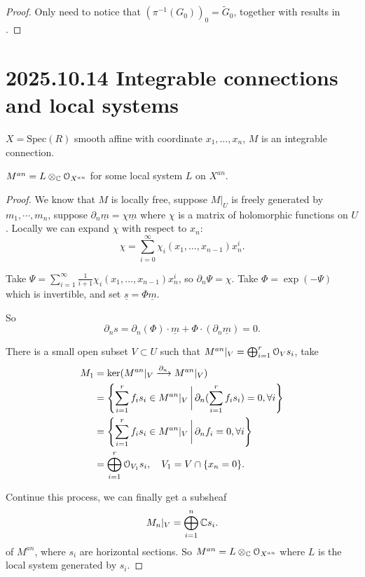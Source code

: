 \documentclass[12pt]{amsart}
\numberwithin{equation}{section}
\renewcommand{\tilde}{\widetilde}
\newcommand{\bigset}[2]{\Biggl\{#1\,\bigg\lvert\,#2\Biggr\}}
\begin{document}
\begin{proof}
  Only need to notice that $(\pi^{-1}(G_0))_0 = \tilde{G}_0$, together with results in \cite{Sch87}.
\end{proof}

 







\section{2025.10.14 Integrable connections and local systems}

$X = \mathrm{Spec}(R)$ smooth affine with coordinate $x_1,\ldots,x_n$, $M$ is an integrable connection. 

\begin{thm}
  $M^{an} = L \otimes_{{\mathbb {C}}} {\mathcal {O}}_{X^{an}}$ for some local system $L$ on $X^{an}$.
\end{thm}

\begin{proof}
  We know that $M$ is locally free, suppose $M|_{U}$ is freely generated by $m_1,\cdots,m_n$, suppose $\partial_n \underline{m} = \chi \underline{m}$ where $\chi$ is a matrix of holomorphic functions on $U$. Locally we can expand $\chi$ with respect to $x_n$:
  \[\chi = \sum_{i=0}^{\infty} \chi_i(x_1,\ldots,x_{n-1}) x_n^i.\]
  
  Take $\Psi = \sum_{i=1}^{\infty} \frac{1}{i+1}\chi_i(x_1,\ldots,x_{n-1}) x_n^i$, so $\partial_n \Psi = \chi$. Take $\Phi = \exp(-\Psi)$ which is invertible, and set $\underline{s} = \Phi \underline{m}$.

  So \[\partial_n s = \partial_n(\Phi) \cdot \underline{m} + \Phi \cdot  (\partial_n \underline{m}) = 0.\]

  There is a small open subset $V \subset U$ such that $M^{an}|_{V} = \bigoplus_{i=1}^{r} {\mathcal {O}}_V s_i$, take
  \begin{align*}
    M_1 &= \ker(M^{an}|_{V} \xrightarrow{\partial_n} M^{an}|_{V}) \\
    &= \bigset{\sum_{i=1}^{r} f_i s_i \in M^{an}|_{V}}{\partial_n (\sum_{i=1}^{r} f_i s_i) = 0, \forall i}\\
    & = \bigset{\sum_{i=1}^{r} f_i s_i \in M^{an}|_{V}}{\partial_n f_i = 0, \forall i}\\
    & = \bigoplus_{i=1}^{r} \CO_{V_1} s_i, \quad V_1 = V \cap \{x_n = 0\}.
  \end{align*}
  
  Continue this process, we can finally get a subsheaf 
  \[M_n|_V = \bigoplus_{i=1}^n {\mathbb {C}} s_i.\] of $M^{an}$, where $s_i$ are horizontal sections. So $M^{an} = L \otimes_{{\mathbb {C}}} {\mathcal {O}}_{X^{an}}$ where $L$ is the local system generated by $s_i$.

\end{proof}
\end{document}
